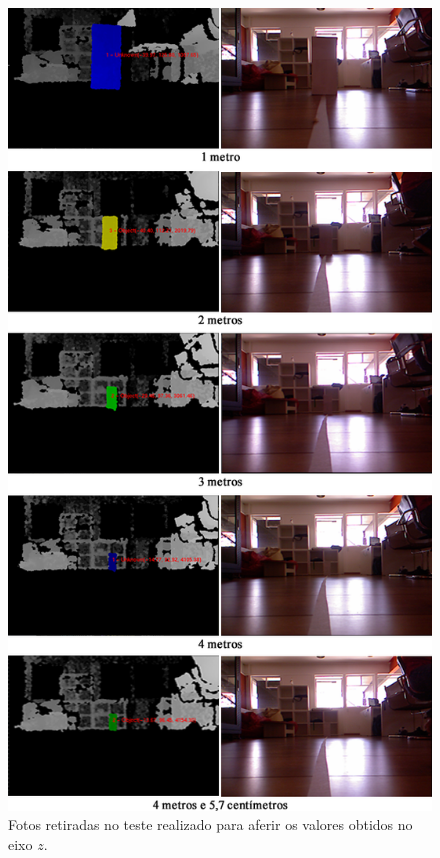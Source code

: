 	\begin{figure}[htb]
		\begin{center}
			\includegraphics[scale=0.6]{figuras/5.Testes/eixoz-imgs.png}
		\end{center}
		\caption{Fotos retiradas no teste realizado para aferir os valores obtidos no eixo $\displaystyle z$.}
		\label{fig:distancias}
	\end{figure}

